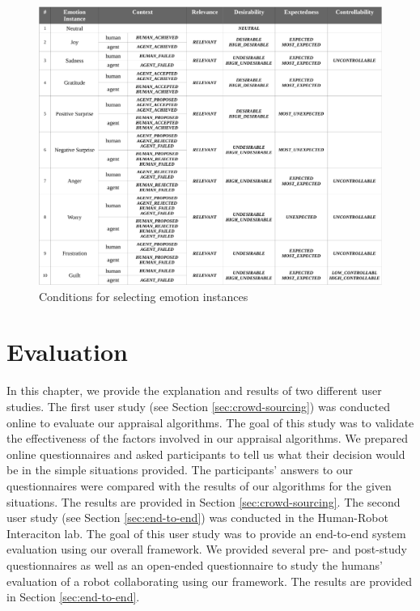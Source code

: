 \documentclass[12pt]{report}
\begin{document}
\begin{figure}
  \centering
  \includegraphics[width=1\textwidth]{figure/emotion_elicitation_croped.pdf}
  \caption{Conditions for selecting emotion instances}
  \label{fig:emotion_elicitation}
\end{figure}

\chapter{Evaluation}
\label{ch:awareness}

In this chapter, we provide the explanation and results of two different user
studies. The first user study (see Section \ref{sec:crowd-sourcing}) was
conducted online to evaluate our appraisal algorithms. The goal of this
study was to validate the effectiveness of the factors involved in our appraisal
algorithms. We prepared online questionnaires and asked participants to tell us
what their decision would be in the simple situations provided. The
participants' answers to our questionnaires were compared with the results of
our algorithms for the given situations. The results are provided in Section
\ref{sec:crowd-sourcing}. The second user study (see Section
\ref{sec:end-to-end}) was conducted in the Human-Robot Interaciton lab. The goal
of this user study was to provide an end-to-end system evaluation using our
overall framework. We provided several pre- and post-study questionnaires as
well as an open-ended questionnaire to study the humans' evaluation of a robot
collaborating using our framework. The results are provided in Section
\ref{sec:end-to-end}.
\end{document}
